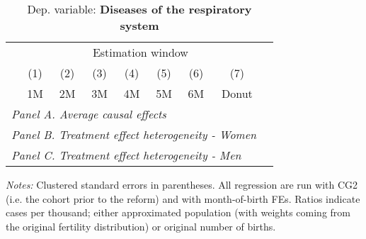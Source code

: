  \begin{table}[H] \begin{threeparttable} \centering \caption{Dep. variable: \textbf{Diseases of the respiratory system}} {\def\sym#1{\ifmmode^{#1}\else\(^{#1}\)\fi} \begin{tabular}{l*{8}{c}} \toprule & \multicolumn{7}{c}{Estimation window} \\ \cmidrule(lr){2-8}
            &\multicolumn{1}{c}{(1)}&\multicolumn{1}{c}{(2)}&\multicolumn{1}{c}{(3)}&\multicolumn{1}{c}{(4)}&\multicolumn{1}{c}{(5)}&\multicolumn{1}{c}{(6)}&\multicolumn{1}{c}{(7)}\\
            &\multicolumn{1}{c}{1M}&\multicolumn{1}{c}{2M}&\multicolumn{1}{c}{3M}&\multicolumn{1}{c}{4M}&\multicolumn{1}{c}{5M}&\multicolumn{1}{c}{6M}&\multicolumn{1}{c}{Donut}\\
\midrule
 \multicolumn{8}{l}{\emph{Panel A. Average causal effects}} \\       \midrule\multicolumn{8}{l}{\emph{Panel B. Treatment effect heterogeneity - Women}} \\       \midrule\multicolumn{8}{l}{\emph{Panel C. Treatment effect heterogeneity - Men}} \\       
\bottomrule \end{tabular} } \begin{tablenotes} \item \scriptsize \emph{Notes:} Clustered standard errors in parentheses. All regression are run with CG2 (i.e. the cohort prior to the reform) and with month-of-birth FEs. Ratios indicate cases per thousand; either approximated population (with weights coming from the original fertility distribution) or original number of births. \end{tablenotes} \end{threeparttable} \end{table} 
